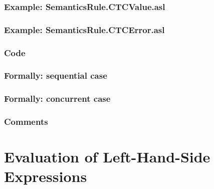 \documentclass{book}
\begin{document}
  \subsection{Example: SemanticsRule.CTCValue.asl}

  \subsection{Example: SemanticsRule.CTCError.asl}

  \subsection{Code}

  \subsection{Formally: sequential case}
  
  \subsection{Formally: concurrent case}

  \subsection{Comments}


\chapter{Evaluation of Left-Hand-Side Expressions \label{chap:eval_lexpr}}
\end{document}
